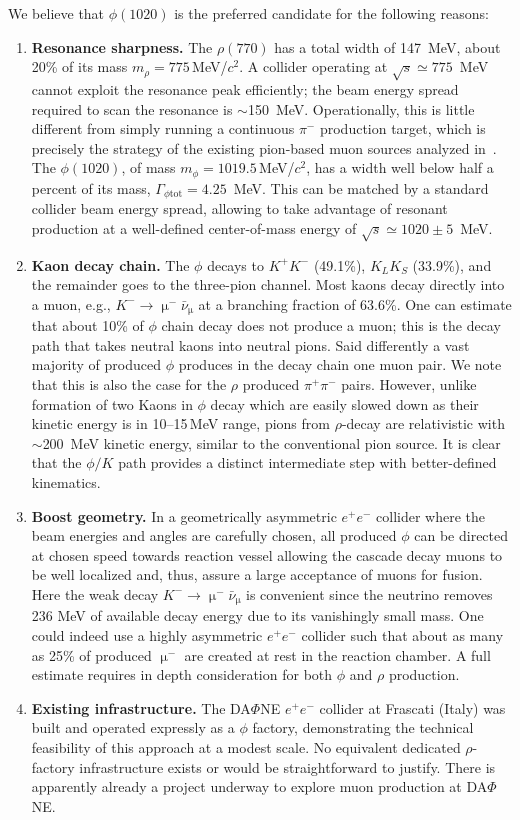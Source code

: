 \documentclass[particles,article,accept,pdftex,moreauthors]{Definitions/mdpi}
\begin{document}
We believe that $\phi(1020)$ is the preferred candidate for the following reasons:
\begin{enumerate}
\item[(1)] 
\textbf{Resonance sharpness.} The $\rho(770)$ has a total width of 147~MeV, about 20\% of its mass $m_\rho=775$\,MeV/$c^2$. A collider operating at $\sqrt{s}\simeq 775$~MeV cannot exploit the resonance peak efficiently; the beam energy spread required to scan the resonance is $\sim$150~MeV. Operationally, this is little different from simply running a continuous $\pi^-$ production target, which is precisely the strategy of the existing pion-based muon sources analyzed in~\cite{Rafelski:1991DOE}. The $\phi(1020)$, of mass $m_\phi=1019.5$\,MeV/$c^2$, has a width well below half a percent of its mass, $\Gamma_{\phi\mathrm{tot}} = 4.25$~MeV. This can be matched by a standard collider beam energy spread, allowing to take advantage of resonant production at a well-defined center-of-mass energy of $\sqrt{s}\simeq1020\pm 5$~MeV.
%
\item[(2)] 
\textbf{Kaon decay chain.} The $\phi$ decays to $K^+K^-$ (49.1\%), $K_LK_S$ (33.9\%), and the remainder goes to the three-pion channel. Most kaons decay directly into a muon, e.g., $K^-\to\upmu^-\bar\nu_\upmu$ at a branching fraction of 63.6\%. One can estimate that about 10\% of $\phi$ chain decay does not produce a muon; this is the decay path that takes neutral kaons into neutral pions. Said differently a vast majority of produced $\phi$ produces in the decay chain one muon pair. We note that this is also the case for the $\rho$ produced $\pi^+\pi^-$ pairs. However, unlike formation of two Kaons in $\phi$ decay which are easily slowed down as their kinetic energy is in 10--15\,MeV range, pions from $\rho$-decay are relativistic with $\sim$200~MeV kinetic energy, similar to the conventional pion source. It is clear that the $\phi/K$ path provides a distinct intermediate step with better-defined kinematics.
\item[(3)] 
\textbf{Boost geometry.} In a geometrically asymmetric $e^+e^-$ collider where the beam energies and angles are carefully chosen, all produced $\phi$ can be directed at chosen speed towards reaction vessel allowing the cascade decay muons to be well localized and, thus, assure a large acceptance of muons for fusion. Here the weak decay $K^-\to\upmu^-\bar\nu_\upmu$ is convenient since the neutrino removes 236 MeV of available decay energy due to its vanishingly small mass. One could indeed use a highly asymmetric $e^+e^-$ collider such that about as many as 25\% of produced $\upmu^-$ are created at rest in the reaction chamber. A full estimate requires in depth consideration for both $\phi$ and $\rho$ production.
%
\item[(4)] 
\textbf{Existing infrastructure.} The DA$\Phi$NE $e^+e^-$ collider at Frascati (Italy) was built and operated expressly as a $\phi$ factory, demonstrating the technical feasibility of this approach at a modest scale. No equivalent dedicated $\rho$-factory infrastructure exists or would be straightforward to justify. There is apparently already a project underway to explore muon production at DA$\Phi$NE.
\end{enumerate}
\end{document}
